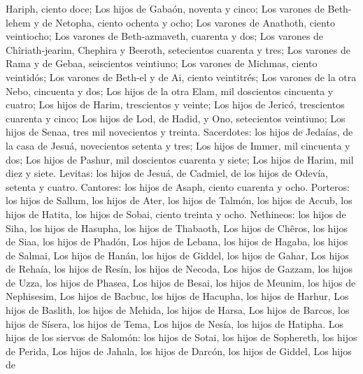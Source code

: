 Hariph, ciento doce;  Los hijos de Gabaón, noventa y cinco;
 Los varones de Beth-lehem y de Netopha, ciento ochenta y
ocho;  Los varones de Anathoth, ciento veintiocho;
 Los varones de Beth-azmaveth, cuarenta y dos;
 Los varones de Chîriath-jearim, Chephira y Beeroth,
setecientos cuarenta y tres;  Los varones de Rama y de
Gebaa, seiscientos veintiuno;  Los varones de Michmas,
ciento veintidós;  Los varones de Beth-el y de Ai, ciento
veintitrés;  Los varones de la otra Nebo, cincuenta y dos;
 Los hijos de la otra Elam, mil doscientos cincuenta y
cuatro;  Los hijos de Harim, trescientos y veinte;
 Los hijos de Jericó, trescientos cuarenta y cinco;
 Los hijos de Lod, de Hadid, y Ono, setecientos veintiuno;
 Los hijos de Senaa, tres mil novecientos y treinta.
 Sacerdotes: los hijos de Jedaías, de la casa de Jesuá,
novecientos setenta y tres;  Los hijos de Immer, mil
cincuenta y dos;  Los hijos de Pashur, mil doscientos
cuarenta y siete;  Los hijos de Harim, mil diez y siete.
 Levitas: los hijos de Jesuá, de Cadmiel, de los hijos de
Odevía, setenta y cuatro.  Cantores: los hijos de Asaph,
ciento cuarenta y ocho.  Porteros: los hijos de Sallum, los
hijos de Ater, los hijos de Talmón, los hijos de Accub, los hijos de
Hatita, los hijos de Sobai, ciento treinta y ocho. 
Nethineos: los hijos de Siha, los hijos de Hasupha, los hijos de
Thabaoth,  Los hijos de Chêros, los hijos de Siaa, los
hijos de Phadón,  Los hijos de Lebana, los hijos de Hagaba,
los hijos de Salmai,  Los hijos de Hanán, los hijos de
Giddel, los hijos de Gahar,  Los hijos de Rehaía, los hijos
de Resín, los hijos de Necoda,  Los hijos de Gazzam, los
hijos de Uzza, los hijos de Phasea,  Los hijos de Besai,
los hijos de Meunim, los hijos de Nephisesim,  Los hijos de
Bacbuc, los hijos de Hacupha, los hijos de Harhur,  Los
hijos de Baslith, los hijos de Mehida, los hijos de Harsa, 
Los hijos de Barcos, los hijos de Sísera, los hijos de Tema,
 Los hijos de Nesía, los hijos de Hatipha. 
Los hijos de los siervos de Salomón: los hijos de Sotai, los hijos de
Sophereth, los hijos de Perida,  Los hijos de Jahala, los
hijos de Darcón, los hijos de Giddel,  Los hijos de
